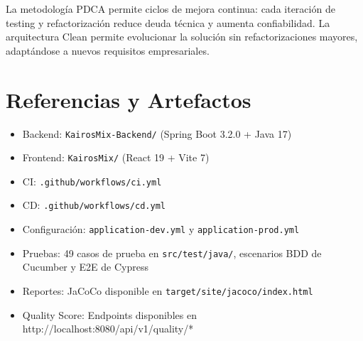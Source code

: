 \documentclass[12pt,a4paper]{article}
\begin{document}
La metodología PDCA permite ciclos de mejora continua: cada iteración de testing y refactorización reduce deuda técnica y aumenta confiabilidad. La arquitectura Clean permite evolucionar la solución sin refactorizaciones mayores, adaptándose a nuevos requisitos empresariales.

\section{Referencias y Artefactos}

\begin{itemize}
    \item Backend: \texttt{KairosMix-Backend/} (Spring Boot 3.2.0 + Java 17)
    \item Frontend: \texttt{KairosMix/} (React 19 + Vite 7)
    \item CI: \texttt{.github/workflows/ci.yml}
    \item CD: \texttt{.github/workflows/cd.yml}
    \item Configuración: \texttt{application-dev.yml} y \texttt{application-prod.yml}
    \item Pruebas: 49 casos de prueba en \texttt{src/test/java/}, escenarios BDD de Cucumber y E2E de Cypress
    \item Reportes: JaCoCo disponible en \texttt{target/site/jacoco/index.html}
    \item Quality Score: Endpoints disponibles en http://localhost:8080/api/v1/quality/*
\end{itemize}
\end{document}
